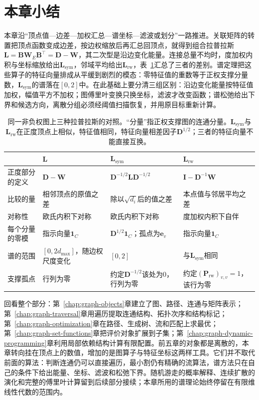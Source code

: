 
\section{本章小结}
\label{sec:graph-spectral-summary}

本章沿“顶点值—边差—加权汇总—谱坐标—滤波或划分”一路推进。关联矩阵的转置把顶点函数变成边差，按边权缩放后再汇总回顶点，就得到组合拉普拉斯$\bm L=\bm B\bm W_E\bm B^{\top}=\bm D-\bm W$，其二次型是沿边变化能量。连接总量不均时，度加权内积与坐标缩放给出$\bm L_{\mathrm{sym}}$，邻域平均给出$\bm L_{\mathrm{rw}}$，表~\ref{tab:graph-spec-laplacian-comparison}汇总了三者的差别。谱定理把这些算子的特征向量排成从平缓到剧烈的模态：零特征值的重数等于正权支撑分量数，$\bm L_{\mathrm{sym}}$的谱落在$[0,2]$中。在此基础上要分清三组区别：沿边变化能量按特征值加权，幅值平方不加权；图傅里叶变换只换坐标，滤波才改变函数；谱松弛给出下界和候选方向，离散分组必须经阈值扫描恢复，并用原目标重新计算。

\begin{table}[!htb]
  \centering\small
  \begin{tabularx}{\linewidth}{@{}lXXX@{}}
    \toprule
    & $\bm L$ & $\bm L_{\mathrm{sym}}$ & $\bm L_{\mathrm{rw}}$\\
    \midrule
    正度部分的定义 & $\bm D-\bm W$ & $\bm D^{-1/2}\bm L\bm D^{-1/2}$ & $\bm I-\bm D^{-1}\bm W$\\
    比较的量 & 相邻顶点的原值之差 & 除以$\sqrt{d_i}$后的值之差 & 本点值与邻居平均之差\\
    对称性 & 欧氏内积下对称 & 欧氏内积下对称 & 度加权内积下自伴\\
    每个分量的零模 & 指示向量$\bm1_C$ & $\bm D^{1/2}\bm1_C$；孤点为$\bm e_v$ & 指示向量$\bm1_C$\\
    谱的范围 & $[0,2d_{\max}]$，随边权尺度变化 & $[0,2]$ & 与$\bm L_{\mathrm{sym}}$相同\\
    支撑孤点 & 行列为零 & 约定$\bm D^{-1/2}$该处为$0$，行列为零 & 约定$(\bm P_{\mathrm{rw}})_{v,v}=1$，该行为零\\
    \bottomrule
  \end{tabularx}
  \caption{同一非负权图上三种拉普拉斯的对照。“分量”指正权支撑图的连通分量。$\bm L_{\mathrm{sym}}$与$\bm L_{\mathrm{rw}}$在正度顶点上相似，特征值相同，特征向量相差因子$\bm D^{1/2}$；三者的特征向量不能直接互换。}
  \label{tab:graph-spec-laplacian-comparison}
\end{table}

回看整个部分：第~\ref{chap:graph-objects}章建立了图、路径、连通与矩阵表示；第~\ref{chap:graph-traversal}章用遍历提取连通结构、拓扑次序和结构标记；第~\ref{chap:graph-optimization}章在路径、生成树、流和匹配上求最优；第~\ref{chap:graph-set-functions}章把评价对象扩展到子集；第~\ref{chap:graph-dynamic-programming}章利用局部依赖结构计算有限配置。前五章的对象都是离散的，本章转向挂在顶点上的数值，增加的是图算子与特征坐标这两样工具。它们并不取代前面的算法：判断连通仍可以直接遍历，最小割仍有精确的流算法，谱方法只在自己的条件下给出能量、坐标、滤波和松弛下界。随机游走的概率解释、连续扩散的演化和完整的傅里叶计算留到后续部分接续；本章所用的谱理论始终停留在有限维线性代数的范围内。
